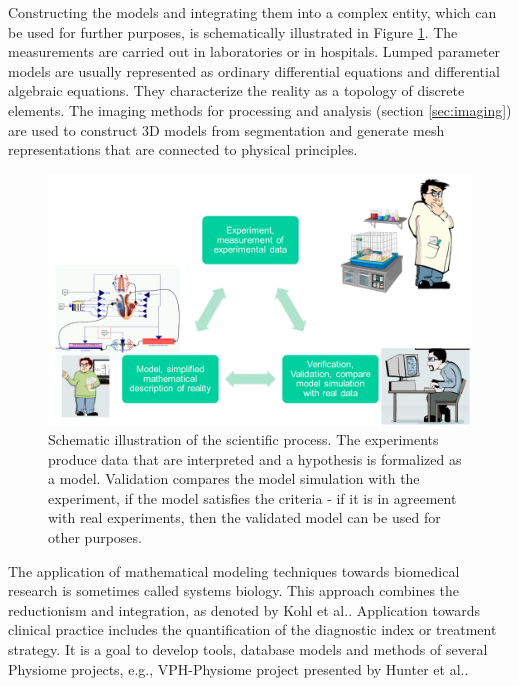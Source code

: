 Constructing the models and integrating them into a complex entity, which can be used for further purposes, is schematically illustrated in Figure \ref{fig:modeling}. The measurements are carried out in laboratories or in hospitals. Lumped parameter models are usually represented as ordinary differential equations and differential algebraic equations. They characterize the reality as a topology of discrete elements. The imaging methods for processing and analysis (section \ref{sec:imaging}) are used to construct 3D models from segmentation and generate mesh representations that are connected to physical principles. 
\begin{figure}[ht]
    \centering
    \includegraphics[width=1\textwidth]{chapter3/modeling.png}
    \caption{Schematic illustration of the scientific process. The experiments produce data that are interpreted and a hypothesis is formalized as a model. Validation compares the model simulation with the experiment, if the model satisfies the criteria - if it is in agreement with real experiments, then the validated model can be used for other purposes. %
    }
    \label{fig:modeling}
\end{figure}

The application of mathematical modeling techniques towards biomedical research is sometimes called systems biology. This approach combines the reductionism and integration, as denoted by Kohl et al.\cite{Kohl2010}. Application towards clinical practice includes the quantification of the diagnostic index or treatment strategy. It is a goal to develop tools, database models and methods of several Physiome projects, e.g., VPH-Physiome project presented by Hunter et al.\cite{Hunter2009}.

